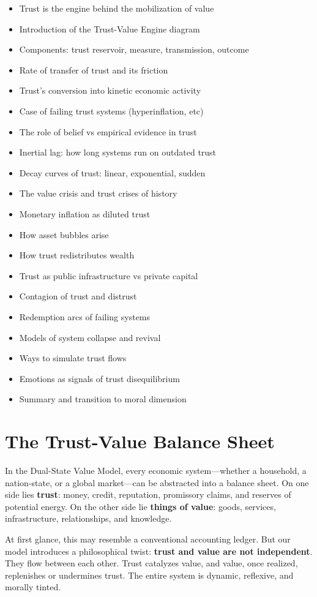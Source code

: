 \documentclass[11pt,oneside]{book}
\begin{document}
\begin{itemize}
\item Trust is the engine behind the mobilization of value
\item Introduction of the Trust-Value Engine diagram
\item Components: trust reservoir, measure, transmission, outcome
\item Rate of transfer of trust and its friction
\item Trust's conversion into kinetic economic activity
\item Case of failing trust systems (hyperinflation, etc)
\item The role of belief vs empirical evidence in trust
\item Inertial lag: how long systems run on outdated trust
\item Decay curves of trust: linear, exponential, sudden
\item The value crisis and trust crises of history
\item Monetary inflation as diluted trust
\item How asset bubbles arise
\item How trust redistributes wealth
\item Trust as public infrastructure vs private capital
\item Contagion of trust and distrust
\item Redemption arcs of failing systems
\item Models of system collapse and revival
\item Ways to simulate trust flows
\item Emotions as signals of trust disequilibrium
\item Summary and transition to moral dimension
\end{itemize}

\section{The Trust-Value Balance Sheet}

In the Dual-State Value Model, every economic system—whether a household, a nation-state, or a global market—can be abstracted into a balance sheet. On one side lies \textbf{trust}: money, credit, reputation, promissory claims, and reserves of potential energy. On the other side lie \textbf{things of value}: goods, services, infrastructure, relationships, and knowledge.

At first glance, this may resemble a conventional accounting ledger. But our model introduces a philosophical twist: \textbf{trust and value are not independent}. They flow between each other. Trust catalyzes value, and value, once realized, replenishes or undermines trust. The entire system is dynamic, reflexive, and morally tinted.
\end{document}
